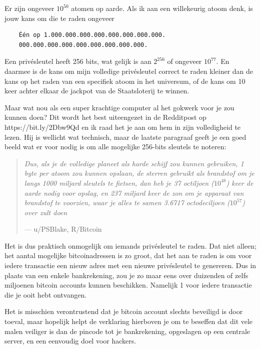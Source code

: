 Er zijn ongeveer $10^{50}$ atomen op aarde. Als ik aan een willekeurig atoom denk, is jouw kans om die te raden ongeveer

\vspace{2em}
\begin{verbatim}
    Één op 1.000.000.000.000.000.000.000.000.
    000.000.000.000.000.000.000.000.000.
\end{verbatim}
\vspace{2em}

Een privésleutel heeft 256 bits, wat gelijk is aan $2^{256}$ of ongeveer $10^{77}$. En daarmee is de kans om mijn volledige privésleutel correct te raden kleiner dan de kans op het raden van een specifiek atoom in het universum, of de kans om 10 keer achter elkaar de jackpot van de Staatsloterij te winnen.

\clearpage
Maar wat nou als een super krachtige computer al het gokwerk voor je zou kunnen doen? Dit wordt het best uiteengezet in de Redditpost op https://bit.ly/2Dbw9Qd en ik raad het je aan om hem in zijn volledigheid te lezen. Hij is wellicht wat technisch, maar de laatste paragraaf geeft je een goed beeld wat er voor nodig is om alle mogelijke 256-bits sleutels te noteren: 

\begin{quotation}
\textit{Dus, als je de volledige planeet als harde schijf zou kunnen gebruiken, 1 byte per atoom zou kunnen opslaan, de sterren gebruikt als brandstof om je langs 1000 miljard sleutels te fietsen, dan heb je 37 octiljoen ($10^{48}$) keer de aarde nodig voor opslag, en 237 miljard keer de zon om je apparaat van brandstof te voorzien, waar je alles te samen 3.6717 octodeciljoen  ($10^{57}$)  over zult doen}\par\raggedleft--- \textup{u/PSBlake, R/Bitcoin}
\end{quotation}

Het is dus praktisch onmogelijk om iemands privésleutel te raden. Dat niet alleen; het aantal mogelijke bitcoinadressen is zo groot, dat het aan te raden is om voor iedere transactie een nieuw adres met een nieuwe privésleutel te genereren. Dus in plaats van een enkele bankrekening, zou je zo maar eens over duizenden of zelfs miljoenen bitcoin accounts kunnen beschikken. Namelijk 1 voor iedere transactie die je ooit hebt ontvangen.

Het is misschien verontrustend dat je bitcoin account slechts beveiligd is door toeval, maar hopelijk helpt de verklaring hierboven je om te beseffen dat dit vele malen veiliger is dan de pincode tot je bankrekening, opgeslagen op een centrale server, en een eenvoudig doel voor hackers.


